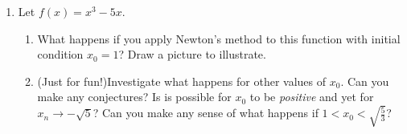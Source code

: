 \begin{exercises}{}{}
\begin{enumerate}
	
  	\item\label{exs:newtonbad} Let $f(x)=x^3-5x$.
  	\begin{enumerate}
   		\item What happens if you apply Newton's method to this function with initial condition $x_0=1$? Draw a picture to illustrate.

    	\item (Just for fun!)\lstsp Investigate what happens for other values of $x_0$. Can you make any conjectures? Is is possible for $x_0$ to be \emph{positive} and yet for $x_n\to-\sqrt 5$? Can you make any sense of what happens if $1<x_0<\sqrt{\frac 53}$?
  	\end{enumerate}
	\end{enumerate}

\end{exercises}
